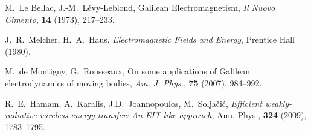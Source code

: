\begin{thebibliography}{99}




M.~Le Bellac, J.-M.~L\'evy-Leblond, 
Galilean Electromagnetism, 
\emph{Il Nuovo Cimento}, \textbf{14} (1973), 217--233.

J.~R.~Melcher, H.~A.~Haus, \emph{Electromagnetic Fields and Energy},
Prentice Hall (1980).


M.~de Montigny, G.~Rousseaux, 
On some applications of Galilean electrodynamics of moving bodies,
\emph{Am. J. Phys.}, \textbf{75} (2007), 984--992.


R.~E.~Hamam, A.~Karalis, J.D.~Joannopoulos, M.~Solja\v ci\'c,
{\em Efficient weakly-radiative wireless energy transfer: An EIT-like
    approach}, Ann. Phys., {\bf 324} (2009), 1783--1795.


\end{thebibliography}




